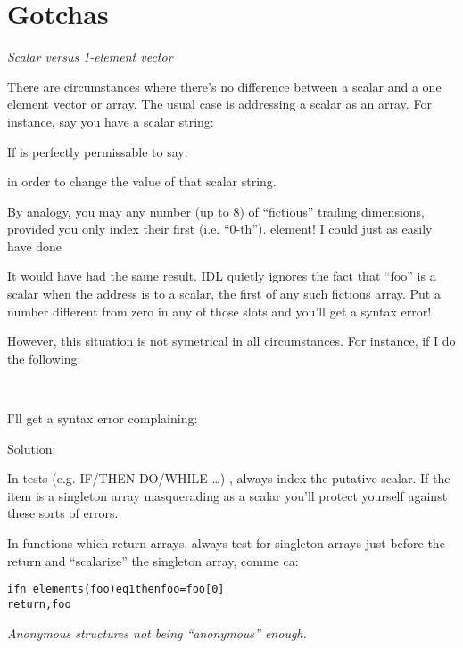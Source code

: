 \section{Gotchas}\label{sec:Gotchas}

  \begin{description}
    \item \textit{Scalar versus 1-element vector}

     There are circumstances where there's no difference between a
     scalar and a one element vector or array.  The usual case is
     addressing a scalar as an array. For instance, say you have a
     scalar string:

  
     If is perfectly permissable to say:


     in order to change the value of that scalar string.

     By analogy, you may any number (up to 8) of ``fictious'' trailing
     dimensions, provided you only index their first (i.e. ``0-th'').
     element!   I could just as easily have done


     It would have had the same result. IDL quietly ignores the fact
     that ``foo'' is a scalar when the address is to a scalar, the
     first of any such fictious array. Put a number different from
     zero in any of those slots and you'll get a syntax error!

     However, this situation is not symetrical in all
     circumstances. For instance, if I do the following:

     \\

     I'll get a syntax error complaining:


\begin{alltt}
% Expression must be a scalar 
%   in this context: <BYTE Array[1]>.
% Execution halted at:  $MAIN$                 
\end{alltt}

    Solution:

    In tests (e.g. IF/THEN DO/WHILE \ldots) , always index the
    putative scalar. If the item is a singleton array masquerading as
    a scalar you'll protect yourself against these sorts of errors.

    In functions which return arrays, always test for singleton arrays
    just before the return and ``scalarize'' the singleton array,
    comme ca:

\begin{alltt}
if n_elements(foo) eq 1 then foo=foo[0]
return,foo
\end{alltt}

    \item \textit{Anonymous structures not being ``anonymous''
    enough.}

\end{description}
